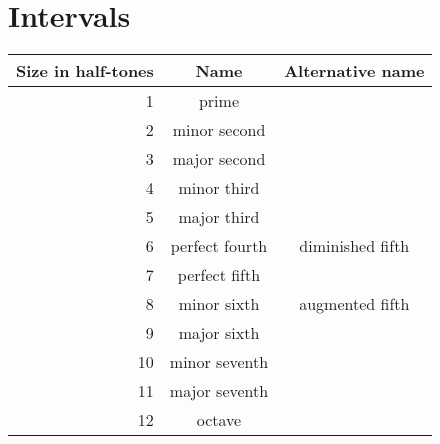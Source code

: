 \section{Intervals}
\begin{tabular}{ r|c|c }
	Size in half-tones & Name & Alternative name\\
	\hline
	1 & prime & \\
	2 & minor second &\\
	3 & major second & \\
	4 & minor third & \\
	5 & major third & \\
	6 & perfect fourth & diminished fifth \\
	7 & perfect fifth & \\
	8 & minor sixth & augmented fifth \\
	9 & major sixth & \\
	10 & minor seventh & \\
	11 & major seventh & \\
	12 & octave
\end{tabular}